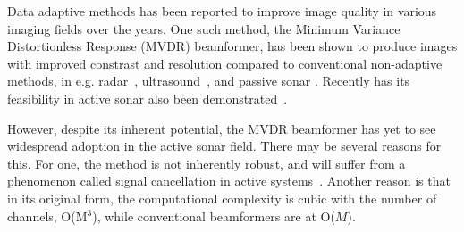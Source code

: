 \documentclass[12pt,journal,captionsoff,onecolumn]{IEEEtran}
\newcommand\1{\vec 1}
\begin{document}
% 
% 
% 
% 
% 
% 
% 
% 

% 
% 
% 
% 
% 

Data adaptive methods has been reported to improve image quality in various imaging fields over the years. One such method, the Minimum Variance Distortionless Response (MVDR) beamformer, has been shown to produce images with improved constrast and resolution compared to conventional non-adaptive methods, in e.g. radar~\cite{Benitz1997}, ultrasound~\cite{}, and passive sonar . Recently has its feasibility in active sonar also been demonstrated~\cite{Blomberg2012a,Blomberg2011,Dursun2009,Lo2004}.

However, despite its inherent potential, the MVDR beamformer has yet to see widespread adoption in the active sonar field. There may be several reasons for this. For one, the method is not inherently robust, and will suffer from a phenomenon called signal cancellation in active systems~\cite{Widrow1982}. Another reason is that in its original form, the computational complexity is cubic with the number of channels, O(M$^3$), while conventional beamformers are at O($M$).
\end{document}
